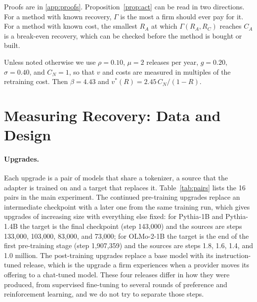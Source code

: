 \documentclass[preprint,12pt,authoryear]{elsarticle}
\begin{document}
Proofs are in \ref{app:proofs}. Proposition~\ref{prop:act} can be read in two directions. For a method with known recovery, $\Gamma$ is the most a firm should ever pay for it. For a method with known cost, the smallest $R_A$ at which $\Gamma(R_A,R_C)$ reaches $C_A$ is a break-even recovery, which can be checked before the method is bought or built.

Unless noted otherwise we use $\rho=0.10$, $\mu=2$ releases per year, $g=0.20$, $\sigma=0.40$, and $C_N=1$, so that $v$ and costs are measured in multiples of the retraining cost. Then $\beta=4.43$ and $v^*(R)=2.45\,C_N/(1-R)$.

\section{Measuring Recovery: Data and Design}\label{sec:design}

\paragraph{Upgrades.} Each upgrade is a pair of models that share a tokenizer, a source that the adapter is trained on and a target that replaces it. Table~\ref{tab:pairs} lists the 16 pairs in the main experiment. The continued pre-training upgrades replace an intermediate checkpoint with a later one from the same training run, which gives upgrades of increasing size with everything else fixed: for Pythia-1B and Pythia-1.4B the target is the final checkpoint (step 143{,}000) and the sources are steps 133{,}000, 103{,}000, 83{,}000, and 73{,}000; for OLMo-2-1B the target is the end of the first pre-training stage (step 1{,}907{,}359) and the sources are steps 1.8, 1.6, 1.4, and 1.0 million. The post-training upgrades replace a base model with its instruction-tuned release, which is the upgrade a firm experiences when a provider moves its offering to a chat-tuned model. These four releases differ in how they were produced, from supervised fine-tuning to several rounds of preference and reinforcement learning, and we do not try to separate those steps.
\end{document}
